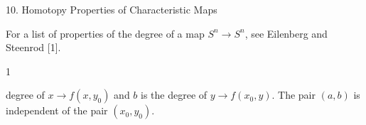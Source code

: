 10. Homotopy Properties of Characteristic Maps

For a list of properties of the degree of a map $S^n \rightarrow S^n$, see Eilenberg and Steenrod [1].

1

degree of $x \rightarrow f(x, y_0)$ and $b$ is the degree of $y \rightarrow f(x_0, y)$. The pair $(a, b)$ is independent of the pair $(x_0, y_0)$.
